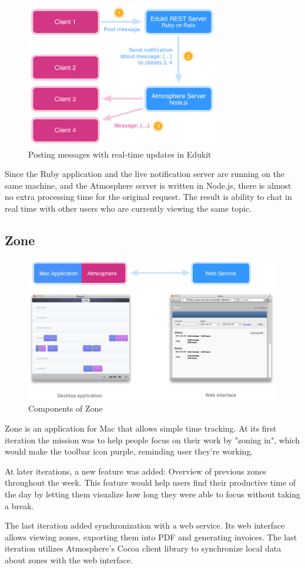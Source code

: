 \begin{figure}[htbp]
  \centering
    \includegraphics[height=2.5in]{figures/EdukitMessages.png}
  \caption{Posting messages with real-time updates in Edukit}
  \label{fig:figures_EdukitMessages}
\end{figure}


Since the Ruby application and the live notification server are running on the same machine, and the Atmosphere server is written in Node.js, there is almost no extra processing time for the original request. The result is ability to chat in real time with other users who are currently viewing the same topic.

\subsection{Zone}

\begin{figure}[htbp]
  \centering
    \includegraphics[height=2.5in]{figures/ZoneDiagram.png}
  \caption{Components of Zone}
  \label{fig:figures_ZoneDiagram}
\end{figure}

Zone is an application for Mac that allows simple time tracking. At its first iteration the mission was to help people focus on their work by "zoning in", which would make the toolbar icon purple, reminding user they're working.

At later iterations, a new feature was added: Overview of previous zones throughout the week. This feature would help users find their productive time of the day by letting them visualize how long they were able to focus without taking a break.

The last iteration added synchronization with a web service. Its web interface allows viewing zones, exporting them into PDF and generating invoices. The last iteration utilizes Atmosphere's Cocoa client library to synchronize local data about zones with the web interface.


